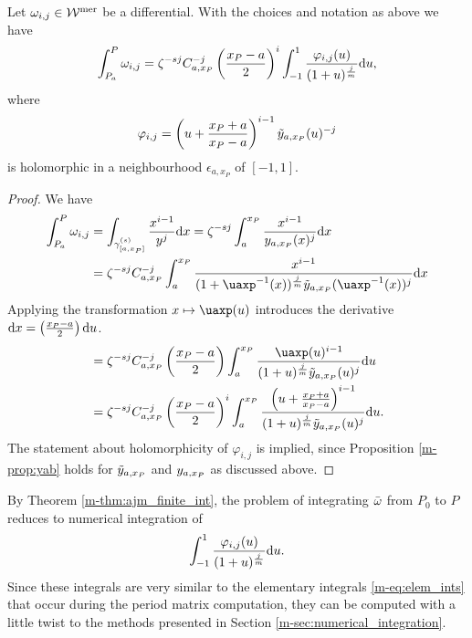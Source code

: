 \documentclass[main.tex]{subfiles}
\begin{document}
  \begin{thm}\label{thm:ajm_finite_int}
  Let $\omega_{i,j} \in \mathcal{W}^{\text{mer}}$ be a differential. With the choices and notation as above we have
 \begin{equation}\label{eq:aj_int}
       \int_{P_a}^P \omega_{i,j} = \zeta^{-sj} C_{a,x_P}^{-j} \left(\frac{x_P-a}{2}\right)^i \int_{-1}^1 \frac{\varphi_{i,j}(u)}{(1+u)^{\frac{j}{m}}}  \mathrm d u,
  \end{equation}
   where
   \begin{equation*}
    \varphi_{i,j}  = \left(u+\frac{x_P+a}{x_P-a}\right)^{i-1} \tilde{y}_{a,x_P}(u)^{-j}
   \end{equation*}
   is holomorphic in a neighbourhood $\epsilon_{a,x_P}$ of $[-1,1]$.
  \end{thm}
  \begin{proof}
    We have
    \begin{align*}
     \int_{P_a}^P \w_{i,j}  & =  \int_{\gamma^{(s)}_{[a,x_P]}} \frac{x^{i-1}}{y^j}  \dx  =  \zeta^{-sj} \int_a^{x_P} \frac{x^{i-1}}{\yaxp(x)^j}  \dx \\  & = 
     \zeta^{-sj} C_{a,x_P}^{-j}  \int_a^{x_P} \frac{x^{i-1}}{(1+\uaxp^{-1}(x))^{\frac{j}{m}}\ytaxp(\uaxp^{-1}(x))^j}  \dx
  \end{align*}
   Applying the transformation $x \mapsto \uaxp(u)$ introduces the derivative $\mathrm d x = \left(\frac{x_P-a}{2}\right) \mathrm d u$.
  \begin{align*}
   & =  \zeta^{-sj} C_{a,x_P}^{-j} \left(\frac{x_P-a}{2}\right) \int_a^{x_P} \frac{\uaxp(u)^{i-1}}{(1+u)^{\frac{j}{m}}\ytaxp(u)^j}  \du \\ & =
   \zeta^{-sj} C_{a,x_P}^{-j} \left(\frac{x_P-a}{2}\right)^i \int_a^{x_P} \frac{\left(u + \frac{x_P+a}{x_P-a}\right)^{i-1}}{(1+u)^{\frac{j}{m}}\ytaxp(u)^j}  \du.
  \end{align*}
  The statement about holomorphicity of $\varphi_{i,j}$ is implied, since Proposition \ref{m-prop:yab} holds for $\tilde{y}_{a,x_P}$ and $y_{a,x_P}$ as discussed above.
  \end{proof}

  \begin{rmk}\label{rmk:ajm_finite_int}
   By Theorem \ref{m-thm:ajm_finite_int}, the problem of integrating $\bar{\omega}$ from $P_0$ to $P$ reduces to numerical integration of
    \begin{equation*}
       \int_{-1}^1 \frac{\varphi_{i,j}(u)}{(1+u)^{\frac{j}{m}}}  \mathrm d u.
   \end{equation*}
   Since these integrals are very similar to the elementary integrals \eqref{m-eq:elem_ints} that occur during the period matrix computation, they can be computed with a little twist to
   the methods presented in Section \ref{m-sec:numerical_integration}.
   \end{rmk}
\end{document}
